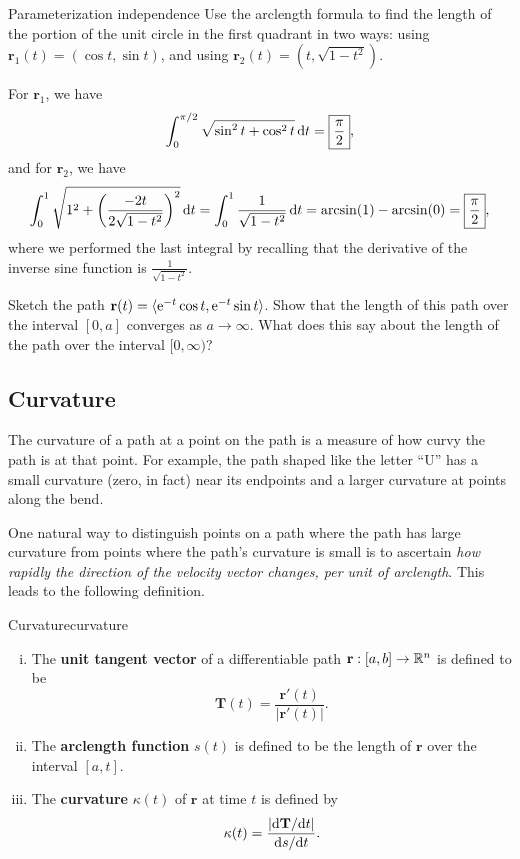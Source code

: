 \documentclass{watsonbook}
\begin{document}
\begin{example}{Parameterization independence}{}
  Use the arclength formula to find the length of the portion of the
  unit circle in the first quadrant in two ways: using $\mathbf{r}_1(t)
  = (\cos t, \sin t)$, and using $\mathbf{r}_2(t) = (t,\sqrt{1-t^2})$. 
\end{example}

\begin{solution}
  For $\mathbf{r}_1$, we have 
  \[
    \int_0^{\pi/2} \sqrt{\sin^2 t + \cos^2 t} \, \mathrm{d} t = \boxed{\frac{\pi}{2}}, 
  \]
  and for $\mathbf{r}_2$, we have
  \[
    \int_0^1 \sqrt{1^2 + \left(\frac{-2t}{2\sqrt{1-t^2}}\right)^2}\, \mathrm{d}
    t =  \int_0^1 \frac{1}{\sqrt{1-t^2}} \, \mathrm{d} t = \arcsin(1) -
    \arcsin(0) = \boxed{\frac{\pi}{2}}, 
  \]
  where we performed the last integral by recalling that the
  derivative of the inverse sine function is
  $\frac{1}{\sqrt{1-t^2}}$. 
\end{solution}

\begin{exercise}{}{}
  Sketch the path
  $\mathbf{r}(t) = \langle \operatorname{e}^{-t} \cos t, \operatorname{e}^{-t} \sin t \rangle$. Show
  that the length of this path over the interval $[0,a]$ converges as
  $a\to\infty$. What does this say about the length of the path over
  the interval $[0,\infty)$?
\end{exercise}

\subsection{Curvature} 

The curvature of a path at a point on the path is a measure of how
curvy the path is at that point. For example, the path shaped like the
letter ``\textsf{U}'' has a small curvature (zero, in fact) near its
endpoints and a larger curvature at points along the bend.

One natural way to distinguish points on a path where the path has
large curvature from points where the path's curvature is small is to
ascertain \textit{how rapidly the direction of the velocity vector
  changes, per unit of arclength}. This leads to the following
definition.

\begin{defn}[breakable]{Curvature}{curvature}
  \begin{enumerate}[(i),leftmargin=12pt,topsep=-6pt,itemsep=4pt]
    \item The \textbf{unit tangent vector} of a differentiable path $\mathbf{r}:[a,b]
  \to \mathbb{R}^n$ is defined to be
  \[
    \mathbf{T}(t) = \frac{\mathbf{r}'(t)}{|\mathbf{r}'(t)|}. 
  \]
  \item The \textbf{arclength function} $s(t)$ is defined to be the length
  of $\mathbf{r}$ over the interval $[a,t]$.
  \item The \textbf{curvature} $\kappa(t)$ of $\mathbf{r}$ at time $t$ is
  defined by
  \[
    \mathbf{\kappa}(t) = \frac{|\mathrm{d}\mathbf{T}/\mathrm{d} t|}{\mathrm{d} s/\mathrm{d} t}. 
  \]
\end{enumerate}
\end{defn}
\end{document}
